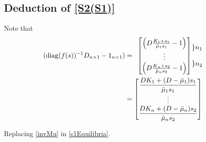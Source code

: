 \documentclass[3p,times]{article}
\DeclareMathOperator{\diag}{diag}
\begin{document}
\subsection{Deduction of \eqref{S2(S1)}}


Note that 
\begin{align}  (\diag(f(s))^{-1}D_{n\times 1}-1_{n\times1})  & = \begin{array}{cc} 
\begin{bmatrix}
\left(D\frac{K_1+s_1}{\bar{\mu}_{1}s_1}-1 \right) \\ \vdots \\ \left(D\frac{K_n+s_2}{\bar{\mu}_{n}s_2}-1\right) 
\end{bmatrix} & \hspace{-0.5cm}\begin{array}{c} \left\} n_1\right. \\ \\ \left\} n_2\right.\end{array}
\end{array} \\
\label{invMu} 
& = \begin{bmatrix}
\dfrac{DK_1+(D-\bar{\mu}_1)s_1}{\bar{\mu}_{1}s_1} \\ \vdots \\ \dfrac{DK_n+(D-\bar{\mu}_n)s_2}{\bar{\mu}_{n}s_2} 
\end{bmatrix}
\end{align}

Replacing \eqref{invMu} in \eqref{s1Equilibria}.
\end{document}
